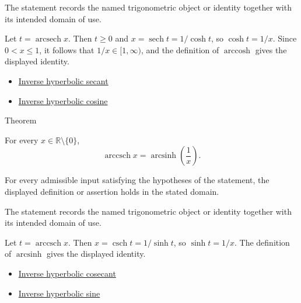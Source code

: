\begin{remark*}[Interpretation]
The statement records the named trigonometric object or identity together with
its intended domain of use.
\end{remark*}

\begin{remark*}[Proof]
Let $t=\operatorname{arcsech}x$. Then $t\geq 0$ and
$x=\operatorname{sech}t=1/\cosh t$, so $\cosh t=1/x$. Since $0<x\leq 1$,
it follows that $1/x\in[1,\infty)$, and the definition of $\operatorname{arccosh}$
gives the displayed identity.
\end{remark*}
\begin{dependencies}
\begin{itemize}
  \item \hyperref[def:inverse-hyperbolic-secant]{Inverse hyperbolic secant}
  \item \hyperref[def:inverse-hyperbolic-cosine]{Inverse hyperbolic cosine}
\end{itemize}
\end{dependencies}

\begin{theorembox}{Theorem}
\begin{theorem}
\label{thm:inverse-hyperbolic-cosecant-reciprocal-form}
For every $x\in\mathbb{R}\setminus\{0\}$,
\[
  \operatorname{arccsch} x=\operatorname{arcsinh}\!\left(\frac{1}{x}\right).
\]
\end{theorem}
\end{theorembox}
\begin{remark*}
For every admissible input satisfying the hypotheses of the statement, the
displayed definition or assertion holds in the stated domain.
\end{remark*}

\begin{remark*}[Interpretation]
The statement records the named trigonometric object or identity together with
its intended domain of use.
\end{remark*}

\begin{remark*}[Proof]
Let $t=\operatorname{arccsch}x$. Then
$x=\operatorname{csch}t=1/\sinh t$, so $\sinh t=1/x$. The definition of
$\operatorname{arcsinh}$ gives the displayed identity.
\end{remark*}
\begin{dependencies}
\begin{itemize}
  \item \hyperref[def:inverse-hyperbolic-cosecant]{Inverse hyperbolic cosecant}
  \item \hyperref[def:inverse-hyperbolic-sine]{Inverse hyperbolic sine}
\end{itemize}
\end{dependencies}

